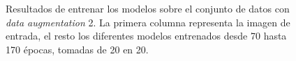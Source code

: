 \begin{figure}[H]
\centering
    \caption{Resultados de entrenar los modelos sobre el conjunto de datos con \textit{data augmentation} 2. La primera columna representa la imagen de entrada, el resto los diferentes modelos entrenados desde 70 hasta 170 épocas, tomadas de 20 en 20.} 
    \label{fig:synthetic_molecules_aug2} 
\end{figure}

